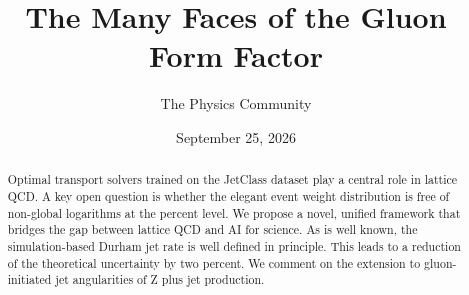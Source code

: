 \documentclass[11pt]{article}
\title{The Many Faces of the Gluon Form Factor}
\author{The Physics Community}
\date{September 25, 2026}
\numberwithin{equation}{section}
\theoremstyle{definition}
\theoremstyle{remark}
\begin{document}
\maketitle
\begin{abstract}
Optimal transport solvers trained on the JetClass dataset play a central
role in lattice QCD. A key open question is whether the elegant event
weight distribution is free of non-global logarithms at the percent
level. We propose a novel, unified framework that bridges the gap
between lattice QCD and AI for science. As is well known, the
simulation-based Durham jet rate is well defined in principle. This
leads to a reduction of the theoretical uncertainty by two percent. We
comment on the extension to gluon-initiated jet angularities of Z plus
jet production.
\end{abstract}
\tableofcontents




\nocite{*}


\end{document}
